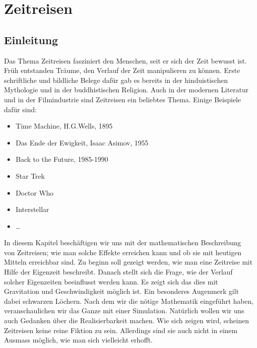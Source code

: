 \chapter{Zeitreisen\label{chapter:thema}}
\begin{refsection}
\section{Einleitung}

	Das Thema Zeitreisen fasziniert den Menschen, seit er sich der Zeit bewusst ist. Früh entstanden Träume, den Verlauf der Zeit manipulieren zu können. Erste schriftliche und bildliche Belege dafür gab es bereits in der hinduistischen Mythologie und in der buddhistischen Religion. Auch in der modernen Literatur und in der Filmindustrie sind Zeitreisen ein beliebtes Thema. Einige Beispiele daf\"ur sind: 
\begin{itemize}
    \item Time Machine, H.G.Wells, 1895 
    \item Das Ende der Ewigkeit, Isaac Asimov, 1955
    \item Back to the Future, 1985-1990
    \item Star Trek
    \item Doctor Who
    \item Interstellar
    \item \dots

\end{itemize}
In diesem Kapitel beschäftigen wir uns mit der mathematischen Beschreibung von Zeitreisen; wie man solche Effekte erreichen kann und ob sie mit heutigen Mitteln erreichbar sind. Zu beginn soll gezeigt werden, wie man eine Zeitreise mit Hilfe der Eigenzeit beschreibt. Danach stellt sich die Frage, wie der Verlauf solcher Eigenzeiten beeinflusst werden kann. Es zeigt sich das dies mit Gravitation und Geschwindigkeit möglich ist. Ein besonderes Augenmerk gilt dabei schwarzen Löchern. Nach dem wir die nötige Mathematik eingeführt haben, veranschaulichen wir das Ganze mit einer Simulation. Natürlich wollen wir uns auch Gedanken über die Realisierbarkeit machen. Wie sich zeigen wird, scheinen Zeitreisen keine reine Fiktion zu sein. Allerdings sind sie auch nicht in einem Ausmass möglich, wie man sich vielleicht erhofft.

\end{refsection}
